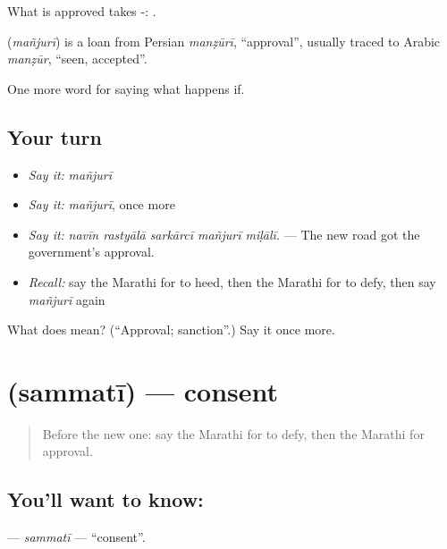 What is approved takes -:  .

\begin{cousinweb}
\textbf{} (\emph{mañjurī}) is a loan from Persian \emph{manẓūrī}, \textquotedblleft{}approval\textquotedblright{}, usually traced to Arabic \emph{manẓūr}, \textquotedblleft{}seen, accepted\textquotedblright{}.
\end{cousinweb}

\begin{grammarlens}[title={What you've built}]
One more word for saying what happens if.
\end{grammarlens}

\subsection*{Your turn}
\begin{itemize}
\raggedright
  \item \emph{Say it:} \emph{mañjurī}
  \item \emph{Say it:} \emph{mañjurī}, once more
  \item \emph{Say it:} \emph{navīn rastyālā sarkārcī mañjurī miḷālī.} — The new road got the government's approval.
  \item \emph{Recall:} say the Marathi for to heed, then the Marathi for to defy, then say \emph{mañjurī} again
\end{itemize}

\begin{tcolorbox}[breakable,colback=teal!4,colframe=teal!35!black,title={Before you move on}]
What does  mean? (\textquotedblleft{}Approval; sanction\textquotedblright{}.) Say it once more.
\end{tcolorbox}
\section[\texorpdfstring{\mr{संमती} (sammatī)}{संमती (sammatī)}]{ (sammatī) — consent}

\label{lesson:MR-C543-sammati}



\begin{quote}
Before the new one: say the Marathi for to defy, then the Marathi for approval.
\end{quote}

\subsection*{You'll want to know: }
\textbf{} — \emph{sammatī} — \textquotedblleft{}consent\textquotedblright{}.

